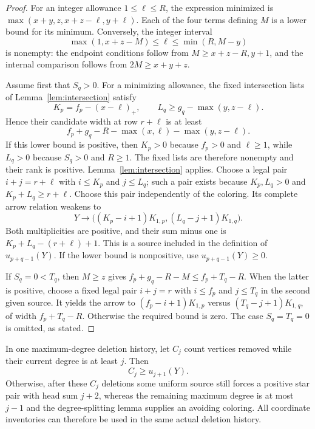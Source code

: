 \documentclass[11pt,a4paper]{article}
\theoremstyle{definition}
\begin{document}
\begin{proof}
For an integer allowance $1\le\ell\le R$, the expression minimized is
$\max(x+y,z,x+z-\ell,y+\ell)$.
Each of the four terms defining $M$ is a lower bound for its minimum.
Conversely, the integer interval
\[
 \max(1,x+z-M)\le\ell\le\min(R,M-y)
\]
is nonempty: the endpoint conditions follow from
$M\ge x+z-R,y+1$, and the internal comparison follows from
$2M\ge x+y+z$.

Assume first that $S_q>0$. For a minimizing allowance, the fixed
intersection lists of Lemma~\ref{lem:intersection} satisfy
\[
 K_p=f_p-(x-\ell)_+,
 \qquad L_q\ge g_q-\max(y,z-\ell).
\]
Hence their candidate width at row $r+\ell$ is at least
\[
 f_p+g_q-R-\max(x,\ell)-\max(y,z-\ell).
\]
If this lower bound is positive, then $K_p>0$ because $f_p>0$ and
$\ell\ge1$, while $L_q>0$ because $S_q>0$ and $R\ge1$.
The fixed lists are therefore nonempty and their rank is positive.
Lemma~\ref{lem:intersection} applies. Choose a legal pair $i+j=r+\ell$
with $i\le K_p$ and $j\le L_q$; such a pair exists because
$K_p,L_q>0$ and $K_p+L_q\ge r+\ell$.
Choose this pair independently of the coloring. Its complete arrow
relation weakens to
\[
 Y\longrightarrow
 \bigl((K_p-i+1)K_{1,p},(L_q-j+1)K_{1,q}\bigr).
\]
Both multiplicities are positive, and their sum minus one is
$K_p+L_q-(r+\ell)+1$. This is a source included in the definition of
$u_{p+q-1}(Y)$.
If the lower bound is nonpositive, use $u_{p+q-1}(Y)\ge0$.

If $S_q=0<T_q$, then $M\ge z$ gives
$f_p+g_q-R-M\le f_p+T_q-R$.
When the latter is positive, choose a fixed legal pair $i+j=r$ with
$i\le f_p$ and $j\le T_q$ in the second given source.
It yields the arrow to $(f_p-i+1)K_{1,p}$ versus $(T_q-j+1)K_{1,q}$,
of width $f_p+T_q-R$.
Otherwise the required bound is zero.
The case $S_q=T_q=0$ is omitted, as stated.
\end{proof}

In one maximum-degree deletion history, let $C_j$ count vertices removed while their current degree is at least $j$. Then
\begin{equation}\label{eq:inventory-envelope}
C_j\ge u_{j+1}(Y).
\end{equation}
Otherwise, after these $C_j$ deletions some uniform source still forces a positive star pair with head sum $j+2$, whereas the remaining maximum degree is at most $j-1$ and the degree-splitting lemma supplies an avoiding coloring. All coordinate inventories can therefore be used in the same actual deletion history.
\end{document}
